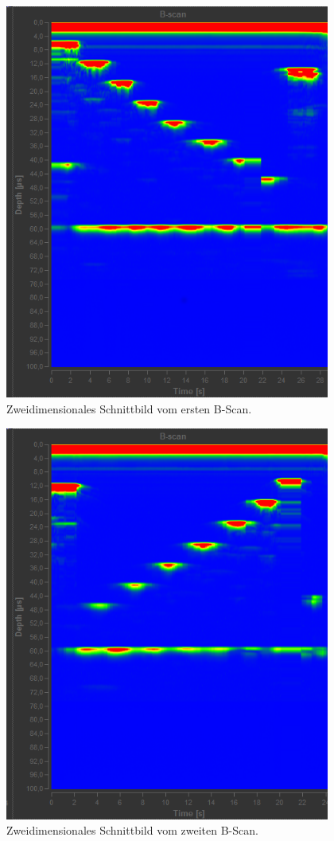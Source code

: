 \begin{figure}
  \centering
  \includegraphics[height=13cm]{Daten/B-Scan1.png}
  \caption{Zweidimensionales Schnittbild vom ersten B-Scan.}
  \label{fig:BScan1}
\end{figure}

\begin{figure}
  \centering
  \includegraphics[height=13cm]{Daten/B-Scan2.png}
  \caption{Zweidimensionales Schnittbild vom zweiten B-Scan.}
  \label{fig:BScan2}
\end{figure}

